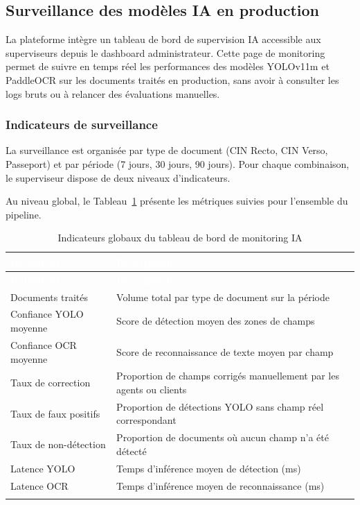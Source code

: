 \subsection{Surveillance des modèles IA en production}
\label{subsec:monitoring-production}

La plateforme intègre un tableau de bord de supervision IA accessible aux superviseurs depuis le dashboard administrateur. Cette page de monitoring permet de suivre en temps réel les performances des modèles YOLOv11m et PaddleOCR sur les documents traités en production, sans avoir à consulter les logs bruts ou à relancer des évaluations manuelles.

\subsubsection{Indicateurs de surveillance}

La surveillance est organisée par type de document (CIN Recto, CIN Verso, Passeport) et par période (7 jours, 30 jours, 90 jours). Pour chaque combinaison, le superviseur dispose de deux niveaux d'indicateurs.

Au niveau global, le Tableau~\ref{tab:ch3-monitoring-global} présente les métriques suivies pour l'ensemble du pipeline.

\renewcommand{\arraystretch}{1.3}
\begin{longtable}{|p{5cm}|p{9.5cm}|}
  \rowcolor{bleu_principal}
  \textcolor{white}{\textbf{Indicateur}} & \textcolor{white}{\textbf{Description}} \\
  \hline
  \endfirsthead
  \rowcolor{bleu_principal}
  \textcolor{white}{\textbf{Indicateur}} & \textcolor{white}{\textbf{Description}} \\
  \hline
  \endhead
  Documents traités       & Volume total par type de document sur la période \\ \hline
  Confiance YOLO moyenne  & Score de détection moyen des zones de champs \\ \hline
  Confiance OCR moyenne   & Score de reconnaissance de texte moyen par champ \\ \hline
  Taux de correction      & Proportion de champs corrigés manuellement par les agents ou clients \\ \hline
  Taux de faux positifs   & Proportion de détections YOLO sans champ réel correspondant \\ \hline
  Taux de non-détection   & Proportion de documents où aucun champ n'a été détecté \\ \hline
  Latence YOLO            & Temps d'inférence moyen de détection (ms) \\ \hline
  Latence OCR             & Temps d'inférence moyen de reconnaissance (ms) \\ \hline
  \caption{Indicateurs globaux du tableau de bord de monitoring IA}
  \label{tab:ch3-monitoring-global}
\end{longtable}

